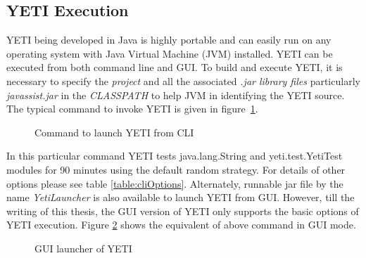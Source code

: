 \subsection{YETI Execution}
YETI being developed in Java is highly portable and can easily run on any operating system with Java Virtual Machine (JVM) installed. YETI can be executed from both command line and GUI. To build and execute YETI, it is necessary to specify the {\it project} and all the associated {\it .jar library files} particularly {\it javassist.jar} in the {\it CLASSPATH} to help JVM in identifying the YETI source. The typical command to invoke YETI is given in figure~\ref{fig:yeticommand}.

\begin{figure}[h!]
	\centering
	\caption{Command to launch YETI from CLI}
	\label{fig:yeticommand}
\end{figure}

 In this particular command YETI tests java.lang.String and yeti.test.YetiTest modules for 90 minutes using the default random strategy. For details of other options please see table \ref{table:cliOptions}. Alternately, runnable jar file by the name {\it YetiLauncher} is also available to launch YETI from GUI. However, till the writing of this thesis, the GUI version of YETI only supports the basic options of YETI execution. Figure \ref{fig:yetiLauncher} shows the equivalent of above command in GUI mode.

\begin{figure}[h]
	\centering
	\caption{GUI launcher of YETI}
	\label{fig:yetiLauncher}
\end{figure}


